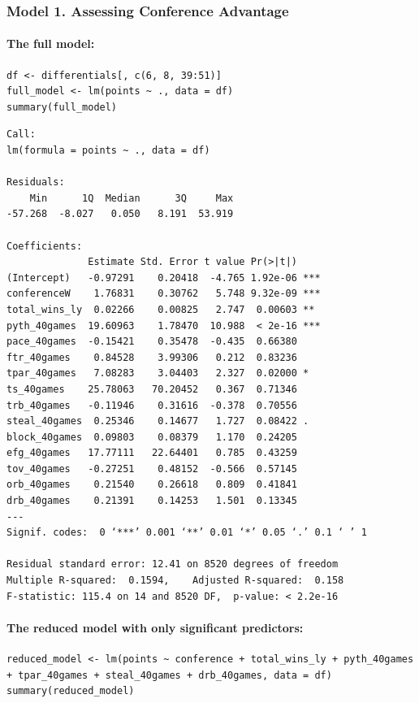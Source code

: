 \documentclass[
    12pt,
    a4paper,
    titlepage,  %
    abstract,  %
    headings=standardclasses,  %
    bibliography=totocnumbered  %
]{scrartcl}
\begin{document}
\subsubsection{Model 1. Assessing Conference Advantage} \label{model1}

\paragraph{The full model:}

\begin{verbatim}
df <- differentials[, c(6, 8, 39:51)]
full_model <- lm(points ~ ., data = df)
summary(full_model)
\end{verbatim}

\begin{Verbatim}
Call:
lm(formula = points ~ ., data = df)

Residuals:
    Min      1Q  Median      3Q     Max 
-57.268  -8.027   0.050   8.191  53.919 

Coefficients:
              Estimate Std. Error t value Pr(>|t|)    
(Intercept)   -0.97291    0.20418  -4.765 1.92e-06 ***
conferenceW    1.76831    0.30762   5.748 9.32e-09 ***
total_wins_ly  0.02266    0.00825   2.747  0.00603 ** 
pyth_40games  19.60963    1.78470  10.988  < 2e-16 ***
pace_40games  -0.15421    0.35478  -0.435  0.66380    
ftr_40games    0.84528    3.99306   0.212  0.83236    
tpar_40games   7.08283    3.04403   2.327  0.02000 *  
ts_40games    25.78063   70.20452   0.367  0.71346    
trb_40games   -0.11946    0.31616  -0.378  0.70556    
steal_40games  0.25346    0.14677   1.727  0.08422 .  
block_40games  0.09803    0.08379   1.170  0.24205    
efg_40games   17.77111   22.64401   0.785  0.43259    
tov_40games   -0.27251    0.48152  -0.566  0.57145    
orb_40games    0.21540    0.26618   0.809  0.41841    
drb_40games    0.21391    0.14253   1.501  0.13345    
---
Signif. codes:  0 ‘***’ 0.001 ‘**’ 0.01 ‘*’ 0.05 ‘.’ 0.1 ‘ ’ 1

Residual standard error: 12.41 on 8520 degrees of freedom
Multiple R-squared:  0.1594,    Adjusted R-squared:  0.158 
F-statistic: 115.4 on 14 and 8520 DF,  p-value: < 2.2e-16
\end{Verbatim}

\paragraph{The reduced model with only significant predictors:}

\begin{verbatim}
reduced_model <- lm(points ~ conference + total_wins_ly + pyth_40games + tpar_40games + steal_40games + drb_40games, data = df)
summary(reduced_model)
\end{verbatim}
\end{document}
